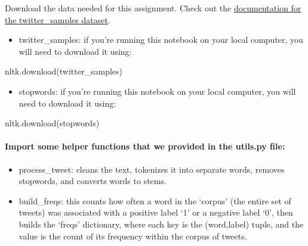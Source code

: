 \documentclass[11pt]{article}
\providecommand{\tightlist}{%
      \setlength{\itemsep}{0pt}\setlength{\parskip}{0pt}}
\newenvironment{Shaded}{}{}
\newcommand{\StringTok}[1]{\textcolor[rgb]{0.25,0.44,0.63}{{#1}}}
\newcommand{\NormalTok}[1]{{#1}}
\begin{document}
Download the data needed for this assignment. Check out the
\href{http://www.nltk.org/howto/twitter.html}{documentation for the
twitter\_samples dataset}.

\begin{itemize}
\tightlist
\item
  twitter\_samples: if you're running this notebook on your local
  computer, you will need to download it using:
\end{itemize}

\begin{Shaded}
\begin{Highlighting}[]
\NormalTok{nltk.download(}\StringTok{\textquotesingle{}twitter\_samples\textquotesingle{}}\NormalTok{)}
\end{Highlighting}
\end{Shaded}

\begin{itemize}
\tightlist
\item
  stopwords: if you're running this notebook on your local computer, you
  will need to download it using:
\end{itemize}

\begin{Shaded}
\begin{Highlighting}[]
\NormalTok{nltk.download(}\StringTok{\textquotesingle{}stopwords\textquotesingle{}}\NormalTok{)}
\end{Highlighting}
\end{Shaded}

\hypertarget{import-some-helper-functions-that-we-provided-in-the-utils.py-file}{%
\paragraph{Import some helper functions that we provided in the utils.py
file:}\label{import-some-helper-functions-that-we-provided-in-the-utils.py-file}}

\begin{itemize}
\tightlist
\item
  process\_tweet: cleans the text, tokenizes it into separate words,
  removes stopwords, and converts words to stems.
\item
  build\_freqs: this counts how often a word in the `corpus' (the entire
  set of tweets) was associated with a positive label `1' or a negative
  label `0', then builds the `freqs' dictionary, where each key is the
  (word,label) tuple, and the value is the count of its frequency within
  the corpus of tweets.
\end{itemize}
\end{document}
